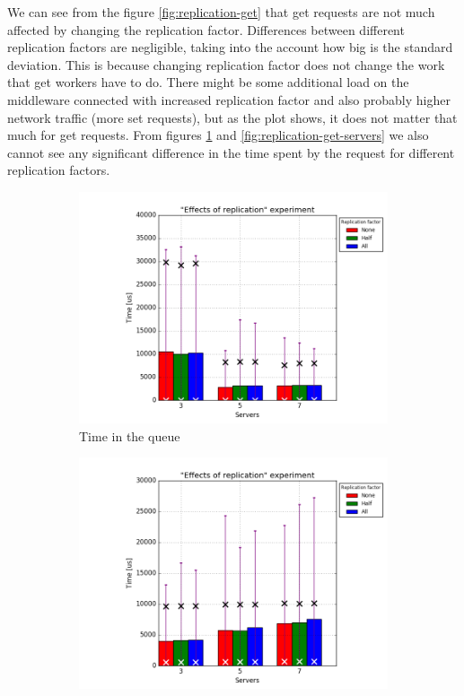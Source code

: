 \documentclass[11pt]{article}
\begin{document}
We can see from the figure \ref{fig:replication-get} that get requests are not much affected by changing the replication factor. Differences between different replication factors are negligible, taking into the account how big is the standard deviation. This is because changing replication factor does not change the work that get workers have to do. There might be some additional load on the middleware connected with increased replication factor and also probably higher network traffic (more set requests), but as the plot shows, it does not matter that much for get requests. From figures \ref{fig:replication-get-queue} and \ref{fig:replication-get-servers} we also cannot see any significant difference in the time spent by the request for different replication factors.

\begin{figure}
\centering
\begin{subfigure}{.5\textwidth}
	\centering
	\includegraphics[width=\linewidth]{plots/replication-get-queue}
	\caption{Time in the queue}
	\label{fig:replication-get-queue}
\end{subfigure}%
\begin{subfigure}{.5\textwidth}
	\centering
	\includegraphics[width=\linewidth]{plots/replication-get-servers}

\end{subfigure}
\end{figure}
\end{document}
